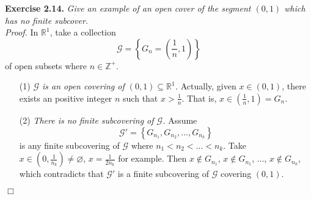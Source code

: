 \documentclass{article}
\begin{document}



\textbf{Exercise 2.14.}
\emph{Give an example of an open cover of the segment $(0, 1)$
which has no finite subcover.} \\

\emph{Proof.}
In $\mathbb{R}^1$, take a collection
$$\mathscr{G} = \left\{ G_n = \left(\frac{1}{n}, 1\right) \right\}$$
of open subsets where $n \in \mathbb{Z}^+$.
\begin{enumerate}
\item[(1)]
\emph{$\mathscr{G}$ is an open covering of $(0, 1) \subseteq \mathbb{R}^1$.}
Actually, given $x \in (0, 1)$, there exists an positive integer $n$ such that $x > \frac{1}{n}$.
That is, $x \in \left(\frac{1}{n}, 1\right) = G_n$.
\item[(2)]
\emph{There is no finite subcovering of $\mathscr{G}$.}
Assume $$\mathscr{G}' = \left\{ G_{n_1}, G_{n_2}, ..., G_{n_k} \right\}$$
is any finite subcovering of $\mathscr{G}$ where $n_1 < n_2 < ... < n_k$.
Take $x \in \left(0, \frac{1}{n_k}\right) \neq \varnothing$,
$x = \frac{1}{2 n_k}$ for example.
Then $x \not\in G_{n_1}$, $x \not\in G_{n_1}$, ..., $x \not\in G_{n_k}$,
which contradicts that $\mathscr{G}'$ is a finite subcovering of $\mathscr{G}$ covering $(0, 1)$.
\end{enumerate}
$\Box$ \\\\



\end{document}
